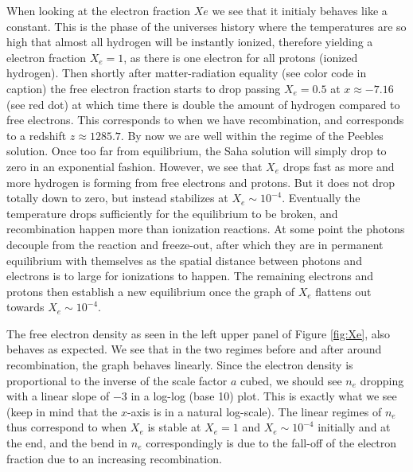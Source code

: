 \documentclass[twocolumn]{aastex62}
\begin{document}
When looking at the electron fraction $Xe$ we see that it initialy behaves like a constant. This is the phase of the universes history where the temperatures are so high that almost all hydrogen will be instantly ionized, therefore yielding a electron fraction $X_e = 1$, as there is one electron for all protons (ionized hydrogen). Then shortly after matter-radiation equality (see color code in caption) the free electron fraction starts to drop passing $X_e = 0.5$ at $x \approx -7.16$ (see red dot) at which time there is double the amount of hydrogen compared to free electrons. This corresponds to when we have recombination, and corresponds to a redshift $z \approx 1285.7$. By now we are well within the regime of the Peebles solution. Once too far from equilibrium, the Saha solution will simply drop to zero in an exponential fashion. However, we see that $X_e$ drops fast as more and more hydrogen is forming from free electrons and protons. But it does not drop totally down to zero, but instead stabilizes at $X_e \sim 10^{-4}$. Eventually the temperature drops sufficiently for the equilibrium to be broken, and recombination happen more than ionization reactions. At some point the photons decouple from the reaction and freeze-out, after which they are in permanent equilibrium with themselves as the spatial distance between photons and electrons is to large for ionizations to happen. The remaining electrons and protons then establish a new equilibrium once the graph of $X_e$ flattens out towards $X_e\sim 10^{-4}$.

The free electron density as seen in the left upper panel of Figure \ref{fig:Xe}, also behaves as expected. We see that in the two regimes before and after around recombination, the graph behaves linearly. Since the electron density is proportional to the inverse of the scale factor $a$ cubed, we should see $n_e$ dropping with a linear slope of $-3$ in a log-log (base 10) plot. This is exactly what we see (keep in mind that the $x$-axis is in a natural log-scale). The linear regimes of $n_e$ thus correspond to when $X_e$ is stable at $X_e = 1$ and $X_e\sim 10^{-4}$ initially and at the end, and the bend in $n_e$ correspondingly is due to the fall-off of the electron fraction due to an increasing recombination. 
\end{document}
